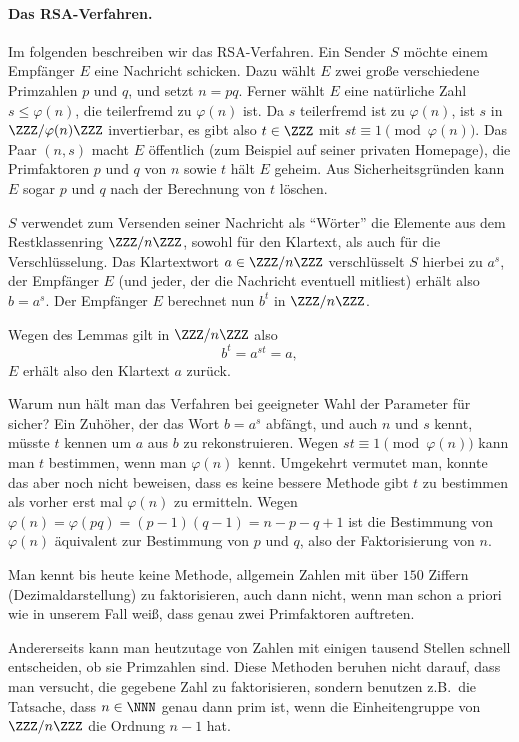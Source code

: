 \documentclass[12pt,a4paper,twoside]{article}
\begin{document}
\paragraph{Das RSA-Verfahren.}
Im folgenden beschreiben wir das RSA-Verfahren. Ein Sender $S$ m\"ochte einem
Empf\"anger $E$ eine Nachricht schicken. Dazu w\"ahlt $E$ zwei gro\ss e
verschiedene Primzahlen $p$ und $q$, und setzt $n=pq$. Ferner w\"ahlt $E$ eine
nat\"urliche Zahl $s\le\varphi(n)$, die teilerfremd zu $\varphi(n)$ ist.  Da
$s$ teilerfremd ist zu $\varphi(n)$, ist $s$ in $\ZZZ/\varphi(n)\ZZZ$
invertierbar, es gibt also $t\in\ZZZ$ mit $st\equiv1\pmod{\varphi(n)}$.  Das
Paar $(n,s)$ macht $E$ \"offentlich (zum Beispiel auf seiner privaten
Homepage), die Primfaktoren $p$ und $q$ von $n$ sowie $t$ h\"alt $E$ geheim.
Aus Sicherheitsgr\"unden kann $E$ sogar $p$ und $q$ nach der Berechnung von
$t$ l\"oschen.

$S$ verwendet zum Versenden seiner Nachricht als ``W\"orter'' die Elemente aus
dem Restklassenring $\ZZZ/n\ZZZ$, sowohl f\"ur den Klartext, als auch f\"ur
die Verschl\"usselung. Das Klartextwort $a\in\ZZZ/n\ZZZ$ verschl\"usselt $S$
hierbei zu $a^s$, der Empf\"anger $E$ (und jeder, der die Nachricht eventuell
mitliest) erh\"alt also $b=a^s$. Der Empf\"anger $E$ berechnet nun $b^t$ in
$\ZZZ/n\ZZZ$.

Wegen des Lemmas gilt in $\ZZZ/n\ZZZ$ also
\[
b^t=a^{st}=a,
\]
$E$ erh\"alt also den Klartext $a$ zur\"uck.

Warum nun h\"alt man das Verfahren bei geeigneter Wahl der Parameter f\"ur
sicher? Ein Zuh\"oher, der das Wort $b=a^s$ abf\"angt, und auch $n$ und $s$
kennt, m\"usste $t$ kennen um $a$ aus $b$ zu rekonstruieren. Wegen
$st\equiv1\pmod{\varphi(n)}$ kann man $t$ bestimmen, wenn man $\varphi(n)$
kennt. Umgekehrt vermutet man, konnte das aber noch nicht beweisen, dass es
keine bessere Methode gibt $t$ zu bestimmen als vorher erst mal $\varphi(n)$
zu ermitteln. Wegen $\varphi(n)=\varphi(pq)=(p-1)(q-1)=n-p-q+1$ ist die
Bestimmung von $\varphi(n)$ \"aquivalent zur Bestimmung von $p$ und $q$, also
der Faktorisierung von $n$.

Man kennt bis heute keine Methode, allgemein Zahlen mit \"uber $150$ Ziffern
(Dezimaldarstellung) zu faktorisieren, auch dann nicht, wenn man schon a
priori wie in unserem Fall wei\ss, dass genau zwei Primfaktoren auftreten.

Andererseits kann man heutzutage von Zahlen mit einigen tausend Stellen
schnell entscheiden, ob sie Primzahlen sind. Diese Methoden beruhen nicht
darauf, dass man versucht, die gegebene Zahl zu faktorisieren, sondern
benutzen z.B.\ die Tatsache, dass $n\in\NNN$ genau dann prim ist, wenn die
Einheitengruppe von $\ZZZ/n\ZZZ$ die Ordnung $n-1$ hat.
\end{document}
